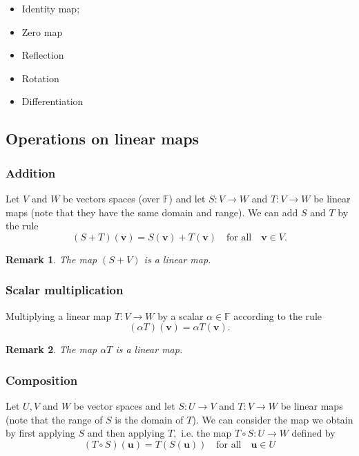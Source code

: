 \documentclass[12pt, a4paper]{article}
\newtheorem*{remark}{Remark}
\theoremstyle{definition}
\theoremstyle{plain}
\newcommand{\bb}[1]{\mathbb{#1}}
\newcommand{\vect}[1]{\mathbf{#1}}
\begin{document}
\begin{itemize}

	\item Identity map;

	\item Zero map

	\item Reflection

	\item Rotation 

	\item Differentiation

\end{itemize}

\subsection{Operations on linear maps}

\subsubsection*{Addition}

Let $V$ and $W$ be vectors spaces (over $\bb{F}$) and let $S:V \rightarrow W$ and $T :V \rightarrow W$ be linear maps (note that they have the same domain and range). We can add $S$ and $T$ by the rule $$(S+T)(\vect{v})=S(\vect{v})+T(\vect{v}) \quad \text{for all} \quad \vect{v} \in V.$$

\begin{remark}
The map $(S+V)$ is a linear map.
\end{remark}

\subsubsection*{Scalar multiplication}

Multiplying a linear map $T :V \rightarrow W$ by a scalar $\alpha \in \bb{F}$ according to the rule $$(\alpha T)(\vect{v})=\alpha T(\vect{v}).$$

\begin{remark}
The map $\alpha T$ is a linear map.
\end{remark} 

\subsubsection*{Composition}

Let $U,V$ and $W$ be vector spaces and let $S : U \rightarrow V$ and $T : V \rightarrow W$ be linear maps (note that the range of $S$ is the domain of $T$). We can consider the map we obtain by first applying $S$ and then applying $T,$ i.e. the map $T \circ S : U \rightarrow W$ defined by $$(T\circ S)(\vect{u})=T(S(\vect{u})) \quad \text{for all} \quad \vect{u} \in U$$
\end{document}
